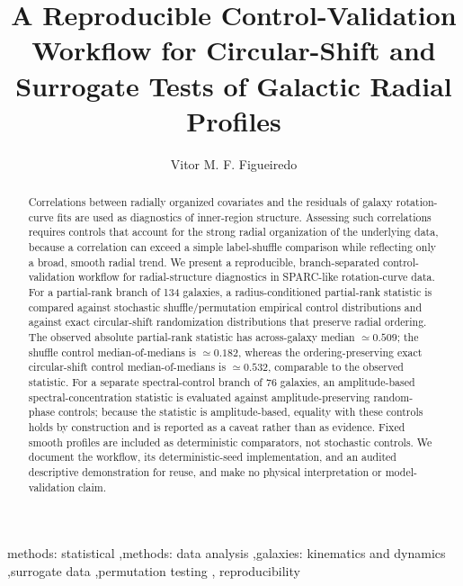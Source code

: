 \documentclass[preprint,12pt]{elsarticle}
\begin{document}
\begin{frontmatter}

\title{A Reproducible Control-Validation Workflow for Circular-Shift and
Surrogate Tests of Galactic Radial Profiles}


\author[aff1]{Vitor M. F. Figueiredo}
\address[aff1]{Independent Researcher, Nisa, Portugal}

\begin{abstract}
\begin{sloppypar}
Correlations between radially organized covariates and the residuals of
galaxy rotation-curve fits are used as diagnostics of inner-region
structure. Assessing such correlations requires controls that account for
the strong radial organization of the underlying data, because a
correlation can exceed a simple label-shuffle comparison while reflecting
only a broad, smooth radial trend. We present a reproducible,
branch-separated control-validation workflow for radial-structure
diagnostics in SPARC-like rotation-curve data. For a partial-rank branch
of 134 galaxies, a radius-conditioned partial-rank statistic is compared
against stochastic shuffle/permutation empirical control distributions and
against exact circular-shift randomization distributions that preserve
radial ordering. The observed absolute partial-rank statistic has
across-galaxy median $\simeq 0.509$; the shuffle control
median-of-medians is $\simeq 0.182$, whereas the ordering-preserving exact
circular-shift control median-of-medians is $\simeq 0.532$, comparable to
the observed statistic. For a separate spectral-control branch of 76
galaxies, an amplitude-based spectral-concentration statistic is evaluated
against amplitude-preserving random-phase controls; because the statistic
is amplitude-based, equality with these controls holds by construction and
is reported as a caveat rather than as evidence. Fixed smooth profiles are
included as deterministic comparators, not stochastic controls. We
document the workflow, its deterministic-seed implementation, and an
audited descriptive demonstration for reuse, and make no physical
interpretation or model-validation claim.
\end{sloppypar}
\end{abstract}

\begin{keyword}
methods: statistical \sep methods: data analysis \sep galaxies: kinematics
and dynamics \sep surrogate data \sep permutation testing \sep
reproducibility
\end{keyword}

\end{frontmatter}
\end{document}
